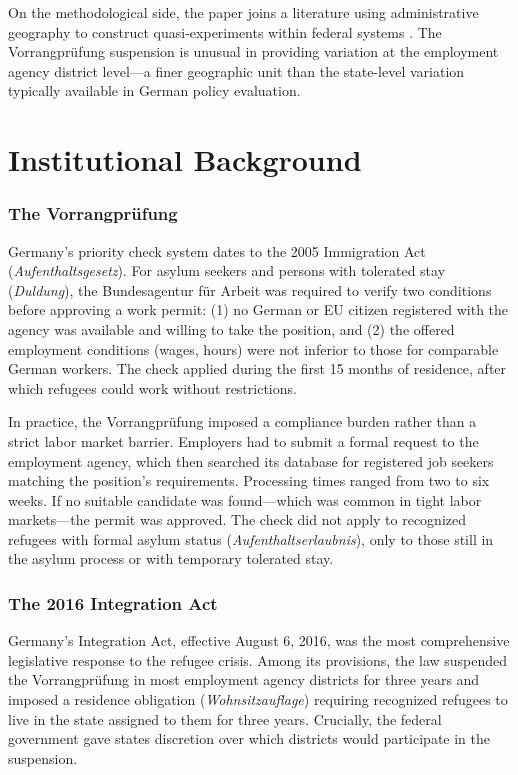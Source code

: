 \documentclass[12pt]{article}
\begin{document}
On the methodological side, the paper joins a literature using administrative geography to construct quasi-experiments within federal systems \citep{dustmann2017}. The Vorrangpr\"ufung suspension is unusual in providing variation at the employment agency district level---a finer geographic unit than the state-level variation typically available in German policy evaluation.


\section{Institutional Background}

\subsubsection*{The Vorrangpr\"ufung} Germany's priority check system dates to the 2005 Immigration Act (\textit{Aufenthaltsgesetz}). For asylum seekers and persons with tolerated stay (\textit{Duldung}), the Bundesagentur f\"ur Arbeit was required to verify two conditions before approving a work permit: (1) no German or EU citizen registered with the agency was available and willing to take the position, and (2) the offered employment conditions (wages, hours) were not inferior to those for comparable German workers. The check applied during the first 15 months of residence, after which refugees could work without restrictions.

In practice, the Vorrangpr\"ufung imposed a compliance burden rather than a strict labor market barrier. Employers had to submit a formal request to the employment agency, which then searched its database for registered job seekers matching the position's requirements. Processing times ranged from two to six weeks. If no suitable candidate was found---which was common in tight labor markets---the permit was approved. The check did not apply to recognized refugees with formal asylum status (\textit{Aufenthaltserlaubnis}), only to those still in the asylum process or with temporary tolerated stay.

\subsubsection*{The 2016 Integration Act} Germany's Integration Act, effective August 6, 2016, was the most comprehensive legislative response to the refugee crisis. Among its provisions, the law suspended the Vorrangpr\"ufung in most employment agency districts for three years and imposed a residence obligation (\textit{Wohnsitzauflage}) requiring recognized refugees to live in the state assigned to them for three years. Crucially, the federal government gave states discretion over which districts would participate in the suspension.
\end{document}
